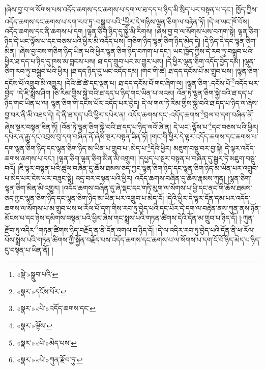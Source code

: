 །ཞེས་བྱ་བ་ལ་སོགས་པས་འདོད་ཆགས་དང་ཆགས་པ་དག་ལ་ཐ་དད་པ་ཉིད་མི་སྲིད་པར་བསྟན་པ་དང་། ཁྱོད་ཀྱིས་འདོད་ཆགས་དང་ཆགས་པ་དག་རབ་ཏུ་:བསྒྲུབ་པའི་\footnote{«སྡེ་»སྒྲུབ་པའི་}ཕྱིར་དེ་གཉིས་ལྷན་ཅིག་ལ་བརྟེན་ཏོ། །དེ་ལ་ཡང་ཁོ་བོས། འདོད་ཆགས་དང་ནི་ཆགས་པ་དག །ལྷན་ཅིག་ཉིད་དུ་སྐྱེ་མི་རིགས། །ཞེས་བྱ་བ་ལ་སོགས་པས་བཀག་སྟེ། ལྷན་ཅིག་ཉིད་དེ་ཡང་ལྟོས་པ་དང་བཅས་པའི་ཕྱིར་མི་འདོད་པས། གཅིག་ཉིད་ལྷན་ཅིག་ཉིད་མེད་དེ། །དེ་ཉིད་དེ་དང་ལྷན་ཅིག་མིན། །ཞེས་བྱ་བས་གཅིག་ཉིད་ཡིན་པའི་ཕྱིར་ལྷན་ཅིག་ཉིད་བཀག་པ་དང་། ཡང་ཁྱོད་ཀྱིས་དེ་རབ་ཏུ་བསྒྲུབ་པའི་ཕྱིར་ཐ་དད་པ་ཉིད་དུ་ཁས་མ་བླངས་པས། ཐ་དད་གྲུབ་པར་མ་གྱུར་པས། །དེ་ཕྱིར་ལྷན་ཅིག་འདོད་བྱེད་དམ། །ལྷན་ཅིག་རབ་ཏུ་བསྒྲུབ་པའི་ཕྱིར། །ཐ་དད་ཉིད་དུ་ཡང་འདོད་དམ། །གང་གི་ཚེ། ཐ་དད་དངོས་པོ་མ་གྲུབ་པས། །ལྷན་ཅིག་དངོས་པོ་འགྲུབ་མི་འགྱུར། །དེའི་ཚེ་ཚེ་དང་ལྡན་པ། ཐ་དད་དངོས་པོ་གང་ཞིག་ལ། །ལྷན་ཅིག་:དངོས་པོ་\footnote{«སྣར་»དངོས་པོར་}འདོད་པར་བྱེད། །དེ་ཇི་སྨྲོས་ཤིག །ཅི་རིམ་གྱིས་སྐྱེ་བའི་ཐ་དད་པ་ཉིད་གང་ཡིན་པ་ལའམ། འོན་ཏེ་ལྷན་ཅིག་སྐྱེ་བའི་ཐ་དད་པ་ཉིད་གང་ཡིན་པ་ལ། ལྷན་ཅིག་གི་དངོས་པོར་འདོད་པར་བྱེད། དེ་ལ་གལ་ཏེ་རིམ་གྱིས་སྐྱེ་བའི་ཐ་དད་པ་ཉིད་ལ་ཞེས་བྱ་བར་ནི་མི་འཐད་དེ། དེ་ནི་ཐ་དད་པའི་ཕྱིར་དཔེར་ན། འདོད་ཆགས་དང་:འདོད་ཆགས་\footnote{«སྣར་»«པེ་»འདོད་ཆགས་དང་}བྲལ་བ་དག་བཞིན་ནོ་ཞེས་སྔར་བསྟན་ཟིན་ཏོ། །འོན་ཏེ་ལྷན་ཅིག་སྐྱེ་བའི་ཐ་དད་པ་ཉིད་ལའོ་ཞེ་ན། དེ་ཡང་:ལྟོས་པ་\footnote{«སྣར་»ལྟོས་}དང་བཅས་པའི་ཕྱིར། དཔེར་ན་རྒྱུ་དང་འབྲས་བུ་དག་བཞིན་ནོ་ཞེས་སྔར་བསྟན་ཟིན་ཏོ། །གང་གི་ཕྱིར་དེ་ལྟར་འདོད་ཆགས་དང་ཆགས་པ་དག་ལྷན་ཅིག་ཉིད་དང་ལྷན་ཅིག་ཉིད་མ་ཡིན་པ་གྲུབ་པ་:མེད་པ་\footnote{«སྣར་»«པེ་»མེད་པས་}དེའི་ཕྱིར། མཇུག་བསྡུ་བར་བྱ་སྟེ། དེ་ལྟར་འདོད་ཆགས་ཆགས་པ་དང་། །ལྷན་ཅིག་ལྷན་ཅིག་མིན་མི་འགྲུབ། །དཔྱད་པ་སྔར་བསྟན་པ་བཞིན་དུ་སྦྱར་ཏེ་མཇུག་བསྡུ་བའོ། །ཇི་ལྟར་བསྟན་པའི་ཚུལ་བཞིན་དུ་ཆོས་ཐམས་ཅད་ཀྱང་ལྷན་ཅིག་ཉིད་དང་ལྷན་ཅིག་ཉིད་མ་ཡིན་པར་འགྲུབ་པ་མེད་པར་ངེས་པར་བཟུང་སྟེ། འདྲ་བར་བསྟན་པའི་ཕྱིར། འདོད་ཆགས་བཞིན་དུ་ཆོས་རྣམས་ཀུན། །ལྷན་ཅིག་ལྷན་ཅིག་མིན་མི་འགྱུར། །འདོད་ཆགས་བཞིན་དུ་ཞེ་སྡང་དང་གཏི་མུག་ལ་སོགས་པ་ཕྱི་དང་ནང་གི་ཆོས་ཐམས་ཅད་ཀྱང་ལྷན་ཅིག་ཉིད་དང་ལྷན་ཅིག་ཉིད་མ་ཡིན་པར་འགྲུབ་པ་མེད་དོ། །དེའི་ཕྱིར་དེ་ལྟར་དོན་དམ་པར་འདོད་ཆགས་ལ་སོགས་པ་མ་གྲུབ་པས་ཕ་རོལ་པོ་དག་གིས་རབ་ཏུ་བྱེད་པའི་དང་པོར་དེ་དག་ལ་བརྟེན་ནས་ཀུན་ནས་ཉོན་མོངས་པ་དང་ཉེས་དམིགས་བསྟན་པའི་ཕྱིར་ཞེས་གང་སྨྲས་པའི་གཏན་ཚིགས་དེའི་དོན་མ་གྲུབ་པ་ཉིད་དོ། །:ཀུན་རྫོབ་ཏུ་འདིར་\footnote{«སྣར་»«པེ་»ཀུན་རྫོབ་ཏུ་}གཏན་ཚིགས་ཉིད་བརྗོད་ན་ནི་དོན་འགལ་བ་ཉིད་དོ། །དེ་ལ་འདིར་རབ་ཏུ་བྱེད་པའི་དོན་ནི་ཕ་རོལ་པོས་སྨྲས་པའི་གཏན་ཚིགས་ཀྱི་སྐྱོན་བརྗོད་པས་འདོད་ཆགས་དང་ཆགས་པ་ལ་སོགས་པ་དག་ངོ་བོ་ཉིད་མེད་པ་ཉིད་དུ་བསྟན་པ་ཡིན་ནོ། །
